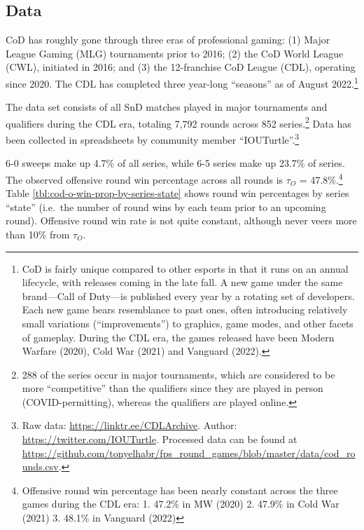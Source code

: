\documentclass{article}
\begin{document}
\hypertarget{data}{%
\subsection{Data}\label{data}}

CoD has roughly gone through three eras of professional gaming: (1)
Major League Gaming (MLG) tournaments prior to 2016; (2) the CoD World
League (CWL), initiated in 2016; and (3) the 12-franchise CoD League
(CDL), operating since 2020. The CDL has completed three year-long
``seasons'' as of August 2022.\footnote{CoD is fairly unique compared to
  other esports in that it runs on an annual lifecycle, with releases
  coming in the late fall. A new game under the same brand---Call of
  Duty---is published every year by a rotating set of developers. Each
  new game bears resemblance to past ones, often introducing relatively
  small variations (``improvements'') to graphics, game modes, and other
  facets of gameplay. During the CDL era, the games released have been
  Modern Warfare (2020), Cold War (2021) and Vanguard (2022).}

The data set consists of all SnD matches played in major tournaments and
qualifiers during the CDL era, totaling 7,792 rounds across 852
series.\footnote{288 of the series occur in major tournaments, which are
  considered to be more ``competitive'' than the qualifiers since they
  are played in person (COVID-permitting), whereas the qualifiers are
  played online.} Data has been collected in spreadsheets by community
member ``IOUTurtle''.\footnote{Raw data:
  \url{https://linktr.ee/CDLArchive}. Author:
  \url{https://twitter.com/IOUTurtle}. Processed data can be found at
  \url{https://github.com/tonyelhabr/fps_round_games/blob/master/data/cod_rounds.csv}.}

6-0 sweeps make up 4.7\% of all series, while 6-5 series make up 23.7\%
of series. The observed offensive round win percentage across all rounds
is \(\tau_O\) = 47.8\%.\footnote{Offensive round win percentage has been
  nearly constant across the three games during the CDL era: 1. 47.2\%
  in MW (2020) 2. 47.9\% in Cold War (2021) 3. 48.1\% in Vanguard (2022)}
Table \ref{tbl:cod-o-win-prop-by-series-state} shows round win
percentages by series ``state'' (i.e.~the number of round wins by each
team prior to an upcoming round). Offensive round win rate is not quite
constant, although never veers more than 10\% from \(\tau_O\).
\end{document}
